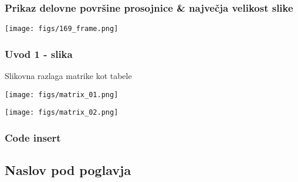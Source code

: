 \documentclass[8pt,aspectratio=169]{beamer} %
\begin{document}

\begin{frame}
	\frametitle{Prikaz delovne površine prosojnice \& največja velikost slike}
	
	
	\begin{center}
		\texttt{[image: figs/169\_frame.png]} %
	\end{center}	
	
\end{frame}


\begin{frame}
	\frametitle{Uvod 1 - slika}
	
	Slikovna razlaga matrike kot tabele
	
	\vspace*{5mm}
	\begin{minipage}{7cm}
		\begin{center}
			\texttt{[image: figs/matrix\_01.png]}
		\end{center}	
	\end{minipage}
	\hfill
	\begin{minipage}{7cm}
		\begin{center}
			\texttt{[image: figs/matrix\_02.png]}
		\end{center}	
	\end{minipage}

\end{frame}


\begin{frame}[fragile]
	\frametitle{Code insert}

	

\end{frame}

\subsection{Naslov pod poglavja}
\end{document}
